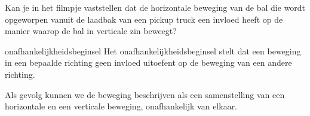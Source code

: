 \documentclass{ximera}
\begin{document}
	\author{Bart Lambregs}
    \xmsource\xmuitleg

\begin{denkvraag*}{}
	Kan je in het filmpje vaststellen dat de horizontale beweging van de bal die wordt opgeworpen vanuit de laadbak van een pickup truck een invloed heeft op de manier waarop de bal in verticale zin beweegt?
	\begin{center}
	\end{center}
\end{denkvraag*}

\begin{definition}{onafhankelijkheidsbeginsel}
	Het onafhankelijkheidsbeginsel stelt dat een beweging in een bepaalde richting geen invloed uitoefent op de beweging van een andere richting. 
\end{definition}

Als gevolg kunnen we de beweging beschrijven als een samenstelling van een horizontale en een verticale beweging, onafhankelijk van elkaar.
\end{document}
